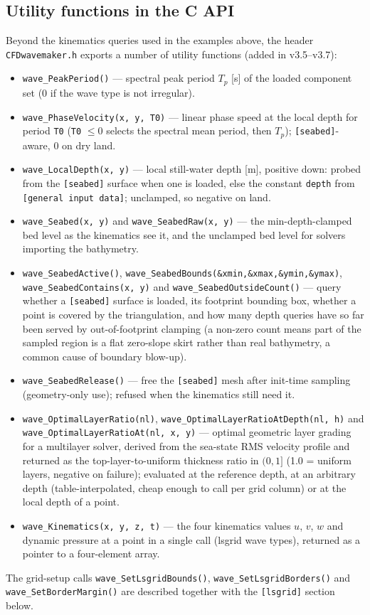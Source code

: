 \documentclass{ol-softwaremanual}
\begin{document}
\subsection{Utility functions in the C API}\label{sec:apiutil}
Beyond the kinematics queries used in the examples above, the header \texttt{CFDwavemaker.h} exports a number of utility functions (added in v3.5--v3.7):
\begin{itemize}
    \item \texttt{wave\_PeakPeriod()} --- spectral peak period $T_p$ [s] of the loaded component set (0 if the wave type is not irregular).
    \item \texttt{wave\_PhaseVelocity(x, y, T0)} --- linear phase speed at the local depth for period \texttt{T0} (\texttt{T0} $\le 0$ selects the spectral mean period, then $T_p$); \texttt{[seabed]}-aware, 0 on dry land.
    \item \texttt{wave\_LocalDepth(x, y)} --- local still-water depth [m], positive down: probed from the \texttt{[seabed]} surface when one is loaded, else the constant \texttt{depth} from \texttt{[general input data]}; unclamped, so negative on land.
    \item \texttt{wave\_Seabed(x, y)} and \texttt{wave\_SeabedRaw(x, y)} --- the min-depth-clamped bed level as the kinematics see it, and the unclamped bed level for solvers importing the bathymetry.
    \item \texttt{wave\_SeabedActive()}, \texttt{wave\_SeabedBounds(\&xmin,\&xmax,\&ymin,\&ymax)}, \texttt{wave\_SeabedContains(x, y)} and \texttt{wave\_SeabedOutsideCount()} --- query whether a \texttt{[seabed]} surface is loaded, its footprint bounding box, whether a point is covered by the triangulation, and how many depth queries have so far been served by out-of-footprint clamping (a non-zero count means part of the sampled region is a flat zero-slope skirt rather than real bathymetry, a common cause of boundary blow-up).
    \item \texttt{wave\_SeabedRelease()} --- free the \texttt{[seabed]} mesh after init-time sampling (geometry-only use); refused when the kinematics still need it.
    \item \texttt{wave\_OptimalLayerRatio(nl)}, \texttt{wave\_OptimalLayerRatioAtDepth(nl, h)} and \texttt{wave\_OptimalLayerRatioAt(nl, x, y)} --- optimal geometric layer grading for a multilayer solver, derived from the sea-state RMS velocity profile and returned as the top-layer-to-uniform thickness ratio in $(0,1]$ (1.0 = uniform layers, negative on failure); evaluated at the reference depth, at an arbitrary depth (table-interpolated, cheap enough to call per grid column) or at the local depth of a point.
    \item \texttt{wave\_Kinematics(x, y, z, t)} --- the four kinematics values $u$, $v$, $w$ and dynamic pressure at a point in a single call (lsgrid wave types), returned as a pointer to a four-element array.
\end{itemize}
The grid-setup calls \texttt{wave\_SetLsgridBounds()}, \texttt{wave\_SetLsgridBorders()} and \texttt{wave\_SetBorderMargin()} are described together with the \texttt{[lsgrid]} section below.
\end{document}
